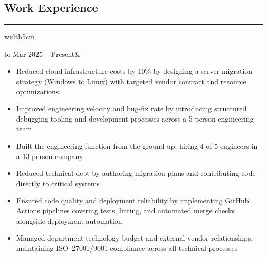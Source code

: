 \documentclass[a4paper]{report}
\def\secsep{\hrule width5cm}
\begin{document}
\subsection*{Work Experience}
\secsep
\vspace{-1em}
\begin{longtabu} to 
    Mar 2025 -- Present& 
    \vspace{-1em}
    \begin{itemize}[leftmargin=2em, topsep=-.5em, parsep=0em]
        \item Reduced cloud infrastructure costs by 10\% by designing a server migration strategy (Windows to Linux) with targeted vendor contract and resource optimizations
        \item Improved engineering velocity and bug-fix rate by introducing structured debugging tooling and development processes across a 5-person engineering team
        \item Built the engineering function from the ground up, hiring 4 of 5 engineers in a 13-person company
        \item Reduced technical debt by authoring migration plans and contributing code directly to critical systems
        \item Ensured code quality and deployment reliability by implementing GitHub Actions pipelines covering tests, linting, and automated merge checks alongside deployment automation
        \item Managed department technology budget and external vendor relationships, maintaining ISO~27001/9001 compliance across all technical processes
    \end{itemize}
    \n


\end{longtabu}
\end{document}
